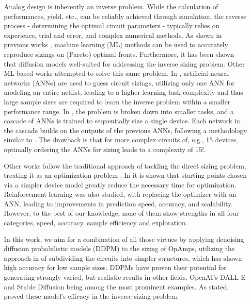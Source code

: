 \documentclass[conference]{IEEEtran}
\begin{document}
	Analog design is inherently an inverse problem. While the calculation of performances, yield, etc., can be reliably achieved through simulation, the reverse process - determining the optimal circuit parameters - typically relies on experience, trial and error, and complex numerical methods. As shown in previous works \cite{ leibl24inverse, lourenco19pareto}, machine learning (ML) methods can be used to accurately reproduce sizings on (Pareto) optimal fronts. Furthermore, it has been shown \cite{eid24diffusion} that diffusion models well-suited for addressing the inverse sizing problem. Other ML-based works attempted to solve this same problem. In \cite{lourenco18}, artificial neural networks (ANNs) are used to guess circuit sizings, utilizing only one ANN for modeling an entire netlist, leading to a higher learning task complexity and thus large sample sizes are required to learn the inverse problem within a smaller performance range. In \cite{beaulieu23cascaded}, the problem is broken down into smaller tasks, and a cascade of ANNs is trained to sequentially size a single device. Each network in the cascade builds on the outputs of the previous ANNs, following a methodology similar to \cite{leibl24inverse}. The drawback is that for more complex circuits of, e.g., 15 devices, optimally ordering the ANNs for sizing leads to a complexity of 15!.
	
	Other works follow the traditional approach of tackling the direct sizing problem, treating it as an optimization problem \cite{fayazi23angel, budak23apostle, wolfe03nnmodel, hakhamaneshi23pretraining}. In \cite{leibl24initial} it is shown that starting points chosen via a simpler device model greatly reduce the necessary time for optimization. Reinforcement learning was also studied, with \cite{settaluri22reinforcement, zhang23multiagentRL}  replacing the optimizer with an ANN, leading to improvements in prediction speed, accuracy, and scalability. 
	However, to the best of our knowledge, none of them show strengths in all four categories, speed, accuracy, sample efficiency and exploration.
	
	In this work, we aim for a combination of all those virtues by applying denoising diffusion probabilistic models (DDPM) to the sizing of OpAmps, utilizing the approach in \cite{leibl24inverse} of subdividing the circuits into simpler structures, which has shown high accuracy for low sample sizes. DDPMs have proven their potential for generating strongly varied, but realistic results in other fields, OpenAI's DALL-E and Stable Diffusion being among the most prominent examples. As stated, \cite{eid24diffusion} proved these model's efficacy in the inverse sizing problem.
	
\end{document}
